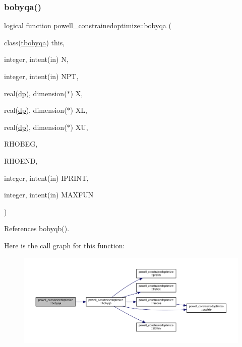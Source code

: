 \subsubsection{\texorpdfstring{bobyqa()}{bobyqa()}}
{\footnotesize\ttfamily logical function powell\+\_\+constrainedoptimize\+::bobyqa (\begin{DoxyParamCaption}\item[{class(\mbox{\hyperlink{structpowell__constrainedoptimize_1_1tbobyqa}{tbobyqa}})}]{this,  }\item[{integer, intent(in)}]{N,  }\item[{integer, intent(in)}]{N\+PT,  }\item[{real(\mbox{\hyperlink{namespacepowell__constrainedoptimize_a8a0275c8eca26a533d0e5d9aef7b9eaa}{dp}}), dimension($\ast$)}]{X,  }\item[{real(\mbox{\hyperlink{namespacepowell__constrainedoptimize_a8a0275c8eca26a533d0e5d9aef7b9eaa}{dp}}), dimension($\ast$)}]{XL,  }\item[{real(\mbox{\hyperlink{namespacepowell__constrainedoptimize_a8a0275c8eca26a533d0e5d9aef7b9eaa}{dp}}), dimension($\ast$)}]{XU,  }\item[{}]{R\+H\+O\+B\+EG,  }\item[{}]{R\+H\+O\+E\+ND,  }\item[{integer, intent(in)}]{I\+P\+R\+I\+NT,  }\item[{integer, intent(in)}]{M\+A\+X\+F\+UN }\end{DoxyParamCaption})\hspace{0.3cm}{\ttfamily [private]}}



References bobyqb().

Here is the call graph for this function\+:
\nopagebreak
\begin{figure}[H]
\begin{center}
\leavevmode
\includegraphics[width=350pt]{namespacepowell__constrainedoptimize_a18b806fe9f14b759021a23344e46743a_cgraph}
\end{center}
\end{figure}
\mbox{\label{namespacepowell__constrainedoptimize_a7c19fea82c74411b0aa5dc322b397049}} 

